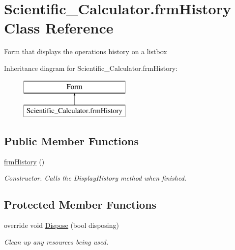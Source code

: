 \hypertarget{class_scientific___calculator_1_1frm_history}{}\section{Scientific\+\_\+\+Calculator.\+frm\+History Class Reference}
\label{class_scientific___calculator_1_1frm_history}


Form that displays the operations history on a listbox  


Inheritance diagram for Scientific\+\_\+\+Calculator.\+frm\+History\+:\begin{figure}[H]
\begin{center}
\leavevmode
\includegraphics[height=2.000000cm]{class_scientific___calculator_1_1frm_history}
\end{center}
\end{figure}
\subsection*{Public Member Functions}
\begin{DoxyCompactItemize}
\item 
\hyperlink{class_scientific___calculator_1_1frm_history_aab640c35614c8ad1c64b1e3150bd8ed1}{frm\+History} ()
\begin{DoxyCompactList}\small\item\em Constructor. Calls the Display\+History method when finished. \end{DoxyCompactList}\end{DoxyCompactItemize}
\subsection*{Protected Member Functions}
\begin{DoxyCompactItemize}
\item 
override void \hyperlink{class_scientific___calculator_1_1frm_history_adf91a5ec5e4df47f129c8a1a57161155}{Dispose} (bool disposing)
\begin{DoxyCompactList}\small\item\em Clean up any resources being used. \end{DoxyCompactList}\end{DoxyCompactItemize}


